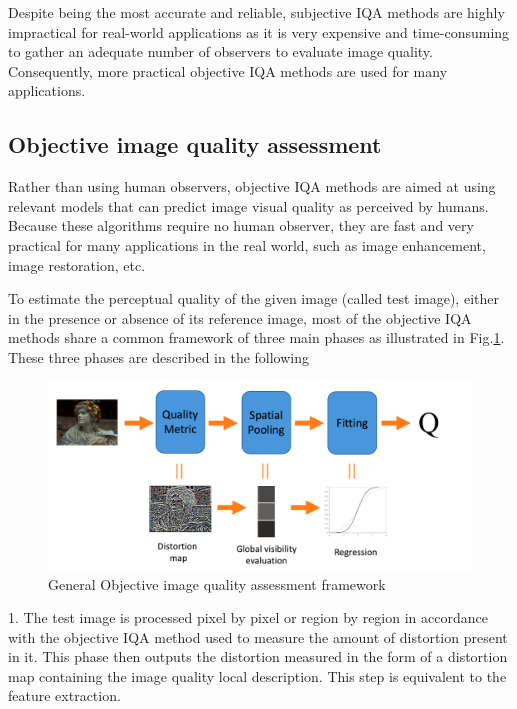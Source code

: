 Despite being the most accurate and reliable, subjective IQA methods are highly impractical for real-world applications as it is very expensive and time-consuming to gather an adequate number of observers to evaluate image quality. Consequently, more practical objective IQA methods are used for many applications.

\subsection{Objective image quality assessment}

Rather than using human observers, objective IQA methods are aimed at using relevant models that can predict image visual quality as perceived by humans. Because these algorithms require no human observer, they are fast and very practical for many applications in the real world, such as image enhancement, image restoration, etc.

To estimate the perceptual quality of the given image (called test image), either in the presence or absence of its reference image, most of the objective IQA methods share a common framework of three main phases as illustrated in Fig.\ref{fig:obj-fw}. These
three phases are described in the following

\begin{figure}[H]
  \includegraphics[width=\linewidth]{figures/objective-framework.png}
  \caption{General Objective image quality assessment framework}
  \label{fig:obj-fw}
\end{figure}

1. The test image is processed pixel by pixel or region by region in accordance with the objective IQA method used to measure the amount of distortion present in it. This phase then outputs the distortion measured in the form of a distortion map containing the image quality local description. This step is equivalent to the feature extraction. 

